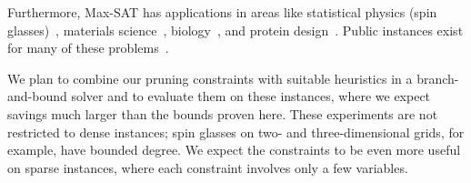 \documentclass[11pt,a4paper]{article}
\theoremstyle{definition}
\theoremstyle{remark}
\begin{document}
Furthermore, Max-SAT has applications in areas like statistical physics
(spin glasses)~\cite{barahona1988application,liers2004computing}, materials
science~\cite{huang2016finding}, biology~\cite{malikic2019phiscs}, and
protein design~\cite{allouche2014computational}. Public instances exist for
many of these problems~\cite{jabs2026maxsat,wiegele2007biqmac}.

%
We plan to combine our pruning
constraints with suitable heuristics in a branch-and-bound solver and to
evaluate them on these instances, where we expect savings much larger than
the bounds proven here. These experiments are not restricted to dense
instances; spin glasses on two- and three-dimensional grids, for example,
have bounded degree. We expect the constraints to be even more useful on
sparse instances, where each constraint involves only a few variables.
\end{document}
